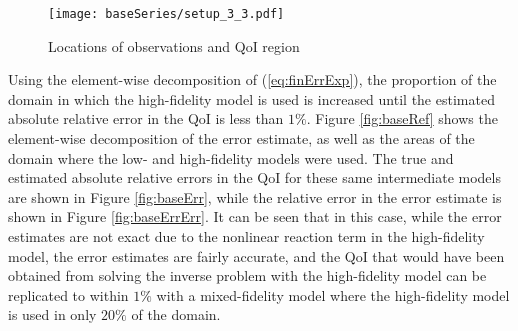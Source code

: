 \begin{figure}[h]
\centering
\texttt{[image: baseSeries/setup\_3\_3.pdf]}
\caption{Locations of observations and QoI region }
\label{fig:baseSetup}
\end{figure}

Using the element-wise decomposition of (\ref{eq:finErrExp}), the proportion of the domain in which the high-fidelity model is used is increased until the estimated absolute relative error in the QoI is less than $1\%$. Figure \ref{fig:baseRef} shows the element-wise decomposition of the error estimate, as well as the areas of the domain where the low- and high-fidelity models were used. The true and estimated absolute relative errors in the QoI for these same intermediate models are shown in Figure \ref{fig:baseErr}, while the relative error in the error estimate is shown in Figure \ref{fig:baseErrErr}. %
It can be seen that in this case, while the error estimates are not exact due to the nonlinear reaction term in the high-fidelity model, the error estimates are fairly accurate, and the QoI that would have been obtained from solving the inverse problem with the high-fidelity model can be replicated to within $1\%$ with a mixed-fidelity model where the high-fidelity model is used in only $20\%$ of the domain.

